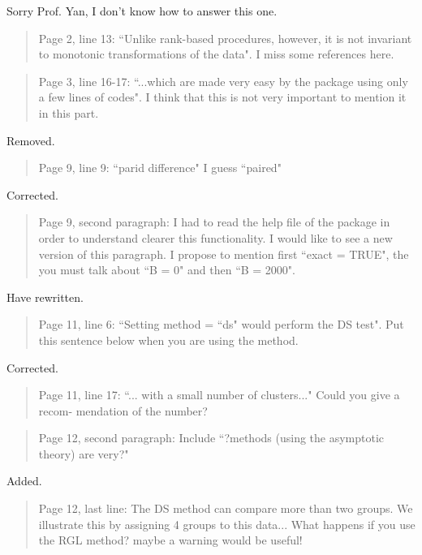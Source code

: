 \documentclass[12pt]{article}
\newenvironment{comment}%
{\begin{quotation}\noindent\small\it\ignorespaces%
  }{\end{quotation}}
\begin{document}
Sorry Prof. Yan, I don't know how to answer this one.

\begin{comment}
Page 2, line 13: ``Unlike rank-based procedures, however, it is not
invariant to monotonic transformations of the data". I miss some
references here.
\end{comment}

\citet{Datt:Satt:rank:2005}

\begin{comment}
Page 3, line 16-17: ``...which are made very easy by the package using only a few
lines of codes". I think that this is not very important to mention it in this part.
\end{comment}

Removed.

\begin{comment}
Page 9, line 9: ``parid difference" I guess ``paired"
\end{comment}

Corrected.

\begin{comment}
Page 9, second paragraph: I had to read the help file of the package in
order to understand clearer this functionality.
I would like to see a new version of this paragraph.
I propose to mention first ``exact = TRUE", the you must talk about ``B = 0" and
then ``B = 2000".
\end{comment}

Have rewritten.

\begin{comment}
Page 11, line 6: ``Setting method = ``ds" would perform the DS test". Put this
sentence below when you are using the method.
\end{comment}

Corrected.

\begin{comment}
Page 11, line 17: ``... with a small number of clusters..." Could you give a recom-
mendation of the number?
\end{comment}

\begin{comment}
Page 12, second paragraph: Include ``?methods (using the asymptotic theory) are
very?"
\end{comment}

Added.

\begin{comment}
Page 12, last line: The DS method can compare more than two groups. We illustrate
this by assigning 4 groups to this data... What happens if you use the RGL method?
maybe a warning would be useful!
\end{comment}
\end{document}
